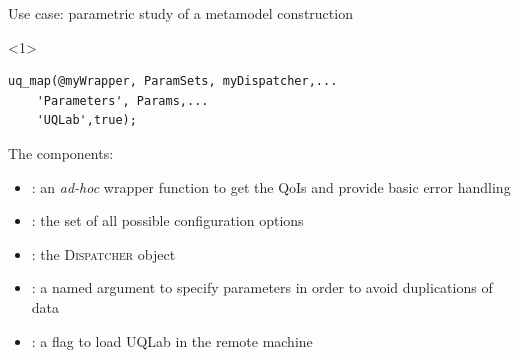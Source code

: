 \documentclass[]{rsuqbeamernew}
\begin{document}
\begin{frame}[fragile]{Use case: parametric study of a metamodel construction}

\begin{onlyenv}<1>
\begin{lstlisting}[basicstyle=\small,numbers=none]
uq_map(@myWrapper, ParamSets, myDispatcher,...
    'Parameters', Params,...
    'UQLab',true);
\end{lstlisting}
\end{onlyenv}

The components:
\begin{itemize}
  \item {}: an \emph{ad-hoc} wrapper function to get the QoIs and provide basic error handling
  \item {}: the set of all possible configuration options
  \item {}: the \textsc{Dispatcher} object
  \item {}: a named argument to specify parameters in order to avoid duplications of data
  \item {}: a flag to load UQLab in the remote machine 
\end{itemize}
    
\end{frame}
\end{document}
